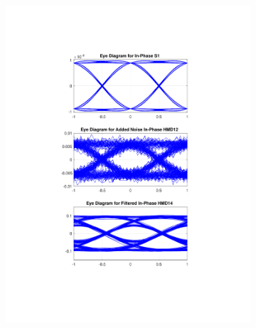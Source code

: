\begin{figure}[H]
	\centering
	\begin{subfigure}{.45\textwidth}
		\centering
		\includegraphics[clip, trim=5cm 4cm 5cm 4cm, width=\textwidth]{./sdf/m_qam_system/figures/eyes/if_n_p_45_09_rc.pdf}
	\end{subfigure}
	\begin{subfigure}{.45\textwidth}
		\centering

\end{subfigure}
\end{figure}
